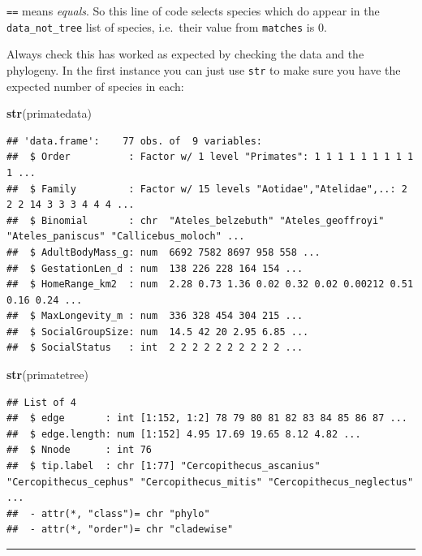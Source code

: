 \documentclass[]{book}
\newenvironment{Shaded}{\begin{snugshade}}{\end{snugshade}}
\newcommand{\KeywordTok}[1]{\textcolor[rgb]{0.13,0.29,0.53}{\textbf{{#1}}}}
\newcommand{\NormalTok}[1]{{#1}}
\theoremstyle{definition}
\theoremstyle{definition}
\theoremstyle{definition}
\theoremstyle{remark}
\begin{document}
\texttt{==} means \emph{equals}. So this line of code selects species
which do appear in the \texttt{data\_not\_tree} list of species,
i.e.~their value from \texttt{matches} is 0.

Always check this has worked as expected by checking the data and the
phylogeny. In the first instance you can just use \texttt{str} to make
sure you have the expected number of species in each:

\begin{Shaded}
\begin{Highlighting}[]
\KeywordTok{str}\NormalTok{(primatedata)}
\end{Highlighting}
\end{Shaded}

\begin{verbatim}
## 'data.frame':    77 obs. of  9 variables:
##  $ Order          : Factor w/ 1 level "Primates": 1 1 1 1 1 1 1 1 1 1 ...
##  $ Family         : Factor w/ 15 levels "Aotidae","Atelidae",..: 2 2 2 14 3 3 3 4 4 4 ...
##  $ Binomial       : chr  "Ateles_belzebuth" "Ateles_geoffroyi" "Ateles_paniscus" "Callicebus_moloch" ...
##  $ AdultBodyMass_g: num  6692 7582 8697 958 558 ...
##  $ GestationLen_d : num  138 226 228 164 154 ...
##  $ HomeRange_km2  : num  2.28 0.73 1.36 0.02 0.32 0.02 0.00212 0.51 0.16 0.24 ...
##  $ MaxLongevity_m : num  336 328 454 304 215 ...
##  $ SocialGroupSize: num  14.5 42 20 2.95 6.85 ...
##  $ SocialStatus   : int  2 2 2 2 2 2 2 2 2 2 ...
\end{verbatim}

\begin{Shaded}
\begin{Highlighting}[]
\KeywordTok{str}\NormalTok{(primatetree)}
\end{Highlighting}
\end{Shaded}

\begin{verbatim}
## List of 4
##  $ edge       : int [1:152, 1:2] 78 79 80 81 82 83 84 85 86 87 ...
##  $ edge.length: num [1:152] 4.95 17.69 19.65 8.12 4.82 ...
##  $ Nnode      : int 76
##  $ tip.label  : chr [1:77] "Cercopithecus_ascanius" "Cercopithecus_cephus" "Cercopithecus_mitis" "Cercopithecus_neglectus" ...
##  - attr(*, "class")= chr "phylo"
##  - attr(*, "order")= chr "cladewise"
\end{verbatim}

\begin{center}\rule{0.5\linewidth}{\linethickness}\end{center}
\end{document}
